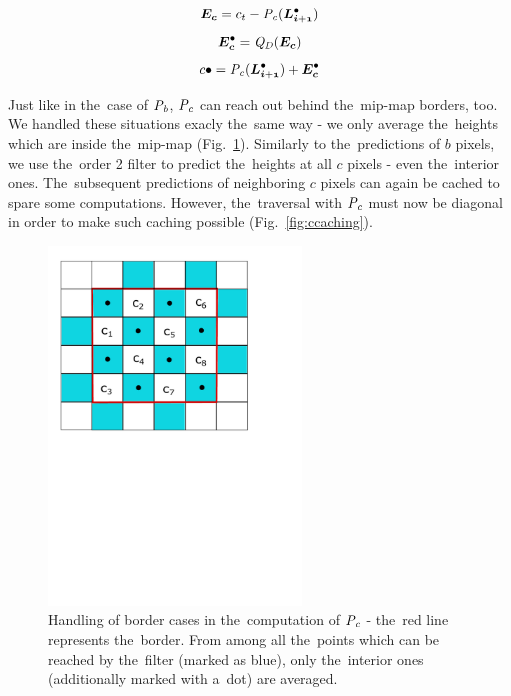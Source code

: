 $$\objnorm{E}{c} = c_t - \opnorm{P}{c}(\ldot{i+1})$$
$$\objdot{E}{c} = \opnorm{Q}{D}(\objnorm{E}{c})$$
\begin{equation}
\label{eq:c}
c\bullet = \opnorm{P}{c}(\ldot{i+1}) + \objdot{E}{c}
\end{equation}

Just like in the~case of $\mathit{P_{b}}$, $\mathit{P_{c}}$ can reach out behind the~mip-map borders, too. We handled these situations exacly the~same way - we only average the~heights which are inside the~mip-map (Fig.~\ref{fig:cborders}). Similarly to the~predictions of $b$ pixels, we use the~order 2 filter to predict the~heights at all $c$ pixels - even the~interior ones. The~subsequent predictions of neighboring $c$ pixels can again be cached to spare some computations. However, the~traversal with $\mathit{P_{c}}$ must now be diagonal in order to make such caching possible (Fig.~\ref{fig:ccaching}).

\begin{figure}
	\includegraphics[trim={1cm 14cm 2cm 0}, clip, width=0.6\textwidth]{figures/cborders.pdf}\centering
	\caption{Handling of border cases in the~computation of $\mathit{P_{c}}$ - the~red line represents the~border. From among all the~points which can be reached by the~filter (marked as blue), only the~interior ones (additionally marked with a~dot) are averaged.}
	\label{fig:cborders}
\end{figure}

